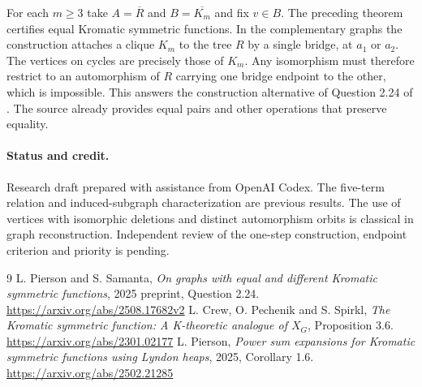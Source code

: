 \documentclass[11pt]{article}
\begin{document}
For each $m\ge3$ take $A=\overline R$ and $B=\overline {K_m}$ and fix
$v\in B$. The preceding theorem certifies equal Kromatic symmetric functions.
In the complementary graphs the construction attaches a clique $K_m$ to
the tree $R$ by a single bridge, at $a_1$ or $a_2$. The vertices on cycles
are precisely those of $K_m$. Any isomorphism must therefore restrict to an
automorphism of $R$ carrying one bridge endpoint to the other, which is
impossible. This answers the construction alternative of Question 2.24
of \cite{ps}. The source already provides equal pairs and other operations
that preserve equality.

\paragraph{Status and credit.} Research draft prepared with assistance from
OpenAI Codex. The five-term relation and induced-subgraph characterization are
previous results. The use of vertices with isomorphic deletions and distinct
automorphism orbits is classical in graph reconstruction. Independent review
of the one-step construction, endpoint criterion and priority is pending.
\begin{thebibliography}{9}
 L. Pierson and S. Samanta, \emph{On graphs with equal and
different Kromatic symmetric functions}, 2025 preprint, Question 2.24.
\url{https://arxiv.org/abs/2508.17682v2}
 L. Crew, O. Pechenik and S. Spirkl, \emph{The Kromatic symmetric
function: A K-theoretic analogue of $X_G$}, Proposition 3.6.
\url{https://arxiv.org/abs/2301.02177}
 L. Pierson, \emph{Power sum expansions for Kromatic symmetric functions using Lyndon heaps}, 2025, Corollary 1.6.
\url{https://arxiv.org/abs/2502.21285}
\end{thebibliography}
\end{document}
